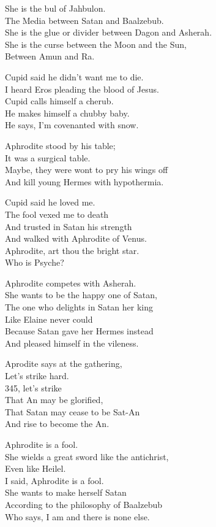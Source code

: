 \documentclass[
]{book}
\begin{document}
She is the bul of Jahbulon.\\
The Media between Satan and Baalzebub.\\
She is the glue or divider between Dagon and Asherah.\\
She is the curse between the Moon and the Sun,\\
Between Amun and Ra.

Cupid said he didn't want me to die.\\
I heard Eros pleading the blood of Jesus.\\
Cupid calls himself a cherub.\\
He makes himself a chubby baby.\\
He says, I'm covenanted with snow.

Aphrodite stood by his table;\\
It was a surgical table.\\
Maybe, they were wont to pry his wings off\\
And kill young Hermes with hypothermia.

Cupid said he loved me.\\
The fool vexed me to death\\
And trusted in Satan his strength\\
And walked with Aphrodite of Venus.\\
Aphrodite, art thou the bright star.\\
Who is Psyche?

Aphrodite competes with Asherah.\\
She wants to be the happy one of Satan,\\
The one who delights in Satan her king\\
Like Elaine never could\\
Because Satan gave her Hermes instead\\
And pleased himself in the vileness.

Aprodite says at the gathering,\\
Let's strike hard.\\
345, let's strike\\
That An may be glorified,\\
That Satan may cease to be Sat-An\\
And rise to become the An.

Aphrodite is a fool.\\
She wields a great sword like the antichrist,\\
Even like Heilel.\\
I said, Aphrodite is a fool.\\
She wants to make herself Satan\\
According to the philosophy of Baalzebub\\
Who says, I am and there is none else.
\end{document}
